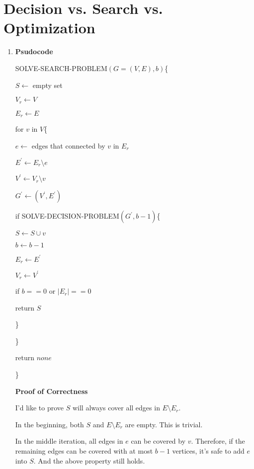 \documentclass[11pt]{article}
\newenvironment{qparts}{\begin{enumerate}[{(}a{)}]}{\end{enumerate}}
\begin{document}
\newpage
\section{Decision vs. Search vs. Optimization}

\begin{qparts}
	\item
	
	\textbf{Psudocode}
	
	SOLVE-SEARCH-PROBLEM$(G=(V, E), b)$\{
	
	\qquad $S \leftarrow$ empty set
	
	\qquad $V_r \leftarrow V$
	
	\qquad $E_r \leftarrow E$
		
	\qquad for $v$ in $V$\{
	
	\qquad\qquad $e \leftarrow$ edges that connected by $v$ in $E_r$
	
	\qquad\qquad $E^\prime \leftarrow E_r \setminus e$
	
	\qquad\qquad $V^\prime \leftarrow V_r \setminus v$
	
	\qquad\qquad $G^\prime \leftarrow (V^\prime, E^\prime)$
	
	\qquad\qquad if SOLVE-DECISION-PROBLEM$(G^\prime, b-1)$\{
	
	\qquad\qquad\qquad $S \leftarrow S \cup v$ 
	
	\qquad\qquad\qquad $b \leftarrow b - 1$ 
	
	\qquad\qquad\qquad $E_r \leftarrow E^\prime$
	
	\qquad\qquad\qquad $V_r \leftarrow V^\prime$
	
	\qquad\qquad\qquad if $b == 0$ or $|E_r| == 0$
	
	\qquad\qquad\qquad\qquad return $S$
	
	\qquad\qquad\}
	
	\qquad\}
	
	\qquad return $none$
	
	\}
	
	\textbf{Proof of Correctness}
	
	I'd like to prove $S$ will always cover all edges in $E \setminus E_r$.
	
	In the beginning, both $S$ and $E \setminus E_r$ are empty. This is trivial.
	
	In the middle iteration, all edges in $e$ can be covered by $v$. Therefore, if the remaining edges can be covered with at most $b-1$ vertices, it's safe to add $e$ into $S$. And the above property still holds.
	

\end{qparts}
\end{document}
